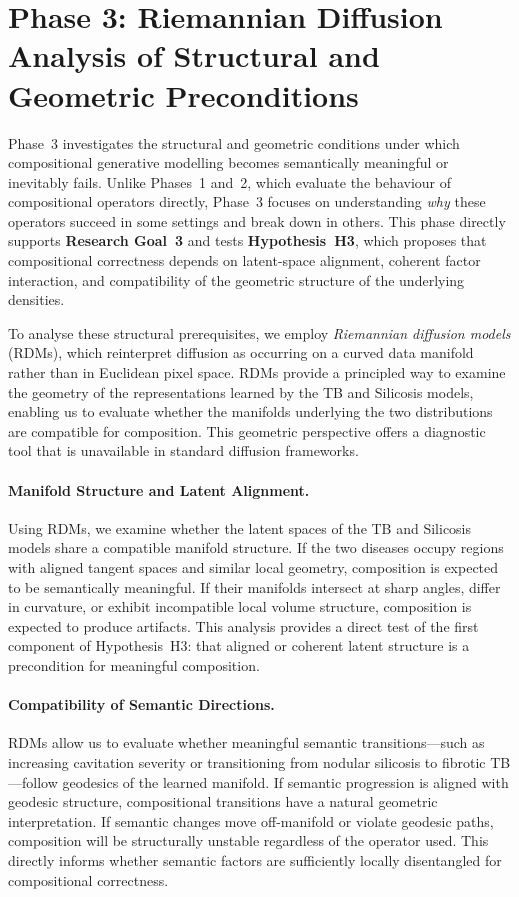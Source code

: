 \section{Phase 3: Riemannian Diffusion Analysis of Structural and Geometric Preconditions}

Phase~3 investigates the structural and geometric conditions under which
compositional generative modelling becomes semantically meaningful or inevitably
fails. Unlike Phases~1 and~2, which evaluate the behaviour of compositional
operators directly, Phase~3 focuses on understanding \emph{why} these operators
succeed in some settings and break down in others. This phase directly supports
\textbf{Research Goal~3} and tests \textbf{Hypothesis~H3}, which proposes that
compositional correctness depends on latent-space alignment, coherent factor
interaction, and compatibility of the geometric structure of the underlying
densities.

To analyse these structural prerequisites, we employ \emph{Riemannian diffusion
models} (RDMs), which reinterpret diffusion as occurring on a curved data
manifold rather than in Euclidean pixel space. RDMs provide a principled way to
examine the geometry of the representations learned by the TB and Silicosis
models, enabling us to evaluate whether the manifolds underlying the two
distributions are compatible for composition. This geometric perspective offers
a diagnostic tool that is unavailable in standard diffusion frameworks.

\paragraph{Manifold Structure and Latent Alignment.}
Using RDMs, we examine whether the latent spaces of the TB and Silicosis models
share a compatible manifold structure. If the two diseases occupy regions with
aligned tangent spaces and similar local geometry, composition is expected to be
semantically meaningful. If their manifolds intersect at sharp angles, differ in
curvature, or exhibit incompatible local volume structure, composition is
expected to produce artifacts. This analysis provides a direct test of the first
component of Hypothesis~H3: that aligned or coherent latent structure is a
precondition for meaningful composition.

\paragraph{Compatibility of Semantic Directions.}
RDMs allow us to evaluate whether meaningful semantic transitions—such as
increasing cavitation severity or transitioning from nodular silicosis to
fibrotic TB—follow geodesics of the learned manifold. If semantic progression is
aligned with geodesic structure, compositional transitions have a natural
geometric interpretation. If semantic changes move off-manifold or violate
geodesic paths, composition will be structurally unstable regardless of the
operator used. This directly informs whether semantic factors are sufficiently
locally disentangled for compositional correctness.


